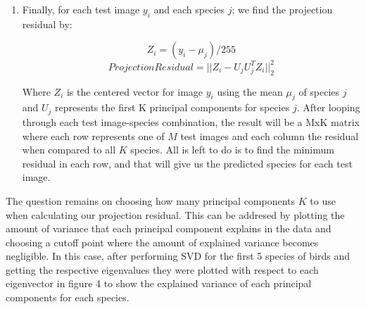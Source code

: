 \documentclass[11pt]{article}
\begin{document}
\begin{singlespace}
\begin{enumerate}
\item Finally, for each test image $y_i$ and each species $j$; we find the projection residual by:

$$ Z_i = (y_i - \mu_j )/255$$
$$ Projection Residual = || Z_i - U_jU_j^TZ_i ||^2_2 $$ 

Where $Z_i$ is the centered vector for image $y_i$ using the mean $\mu_j$ of species $j$ and $U_j$ represents the first K principal components for species $j$. After looping through each test image-species combination, the result will be a MxK matrix where each row represents one of $M$ test images and each column the residual when compared to all $K$ species. All is left to do is to find the minimum residual in each row, and that will give us the predicted species for each test image.
\end{enumerate}

The question remains on choosing how many principal components $K$ to use when calculating our projection residual. This can be addresed by plotting the amount of variance that each principal component explains in the data and choosing a cutoff point where the amount of explained variance becomes negligible. In this case, after performing SVD for the first 5 species of birds and getting the respective eigenvalues they were plotted with respect to each eigenvector in figure 4 to show the explained variance of each principal components for each species. \\

\begin{figure}[h]
    \centering
    

\end{figure}
\end{singlespace}
\end{document}
